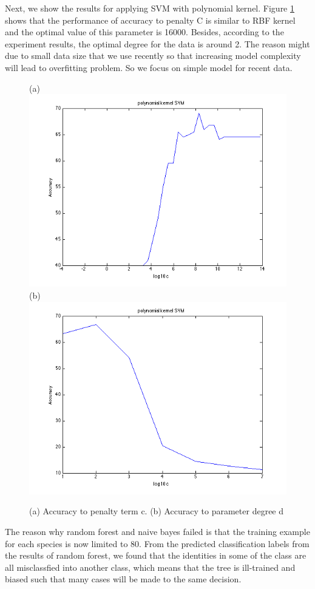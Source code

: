 \documentclass{article} %
\begin{document}
Next, we show the results for applying SVM with polynomial kernel. Figure \ref{fig:poly} shows that the performance of accuracy to penalty C is similar to RBF kernel and the optimal value of this parameter is 16000. Besides, according to the experiment results, the optimal degree for the data is around 2. The reason might due to small data size that we use recently so that increasing model complexity will lead to overfitting problem. So we focus on simple model for recent data.  
 
\begin{figure}[ht!]
    \centering
    {(a)\includegraphics[width=0.45\linewidth]{./Figure/Poly_cost_accuracy.png}
    (b)\includegraphics[width=0.45\linewidth]{./Figure/Poly_degree_accuracy.png}}
    \caption{(a) Accuracy to penalty term c. (b) Accuracy to parameter degree d}
    \label{fig:poly}
\end{figure}

The reason why random forest and naive bayes failed is that the training example for each species is now limited to 80. From the predicted classification labels from the results of random forest, we found that the identities in some of the class are all misclassfied into another class, which means that the tree is ill-trained and biased such that many cases will be made to the same decision. 




\end{document}
